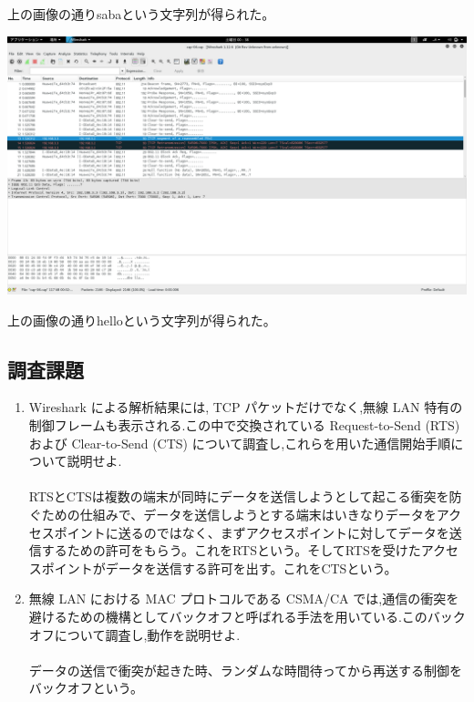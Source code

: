 \documentclass[a4j]{celb-report}
\begin{document}
上の画像の通りsabaという文字列が得られた。
\begin{center}
 \includegraphics[width=17cm]{../LAN1/sysExp3/Screenshot.png}
\end{center}
上の画像の通りhelloという文字列が得られた。
\subsection{調査課題}
\begin{enumerate}
\renewcommand{\labelenumi}{(\arabic{enumi})}
 \item Wireshark による解析結果には, TCP パケットだけでなく,無線 LAN 特有の制御フレームも表示される.この中で交換されている Request-to-Send (RTS) および Clear-to-Send (CTS) について調査し,これらを用いた通信開始手順について説明せよ.\\
\\
RTSとCTSは複数の端末が同時にデータを送信しようとして起こる衝突を防ぐための仕組みで、データを送信しようとする端末はいきなりデータをアクセスポイントに送るのではなく、まずアクセスポイントに対してデータを送信するための許可をもらう。これをRTSという。そしてRTSを受けたアクセスポイントがデータを送信する許可を出す。これをCTSという。\\
 \item 無線 LAN における MAC プロトコルである CSMA/CA では,通信の衝突を避けるための機構としてバックオフと呼ばれる手法を用いている.このバックオフについて調査し,動作を説明せよ.\\
\\
データの送信で衝突が起きた時、ランダムな時間待ってから再送する制御をバックオフという。
\end{enumerate}
\end{document}
